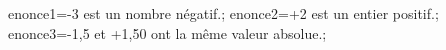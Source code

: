 \documentclass[exercice]{thedocument}%
\begin{document}
%
    \>enonce1=-3 est un nombre négatif.;%
    \>enonce2=+2 est un entier positif.;%
    \>enonce3=-1,5 et +1,50 ont la même valeur absolue.;%
\end{document}
